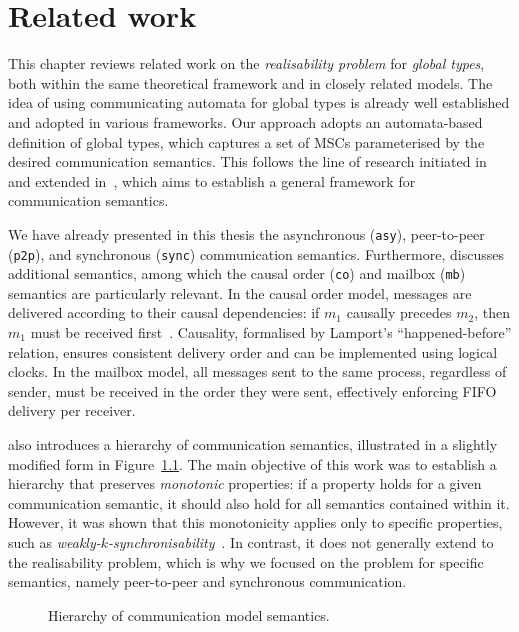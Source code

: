 \chapter{Related work}\label{sec:rel}
This chapter reviews related work on the \emph{realisability problem} 
for \emph{global types}, both within the same theoretical framework 
and in closely related models.  
The idea of using communicating automata for global types is already 
well established and adopted in various frameworks. Our approach 
adopts an automata-based definition of global types, which captures a 
set of MSCs parameterised by the desired communication semantics.  
This follows the line of research initiated in~\cite{di2023partial} 
and extended in~\cite{di2025realisability}, which aims to establish a 
general framework for communication semantics.  

We have already presented in this thesis the asynchronous 
(\verb|asy|), peer-to-peer (\verb|p2p|), and synchronous 
(\verb|sync|) communication semantics.  
Furthermore, \cite{di2023partial} discusses additional semantics, 
among which the causal order (\verb|co|) and mailbox (\verb|mb|) 
semantics are particularly relevant.
In the causal order model, messages are delivered according 
to their causal dependencies: if $m_1$ causally precedes $m_2$, then 
$m_1$ must be received first~\cite{lamport2019time}.  
Causality, formalised by Lamport’s ``happened-before'' relation, ensures 
consistent delivery order and can be implemented using logical clocks.  
In the mailbox model, all messages sent to the same process, 
regardless of sender, must be received in the order they were sent, 
effectively enforcing FIFO delivery per receiver.  

\cite{di2023partial} also introduces a hierarchy of communication 
semantics, illustrated in a slightly modified form in 
Figure~\ref{fig:coms}.  
The main objective of this work was to establish a hierarchy that 
preserves \emph{monotonic} properties: if a property holds for a given 
communication semantic, it should also hold for all semantics 
contained within it.  
However, it was shown that this monotonicity applies only to specific 
properties, such as \emph{weakly-$k$-synchronisability}~\cite{di2023partial}.  
In contrast, it does not generally extend to the realisability 
problem, which is why we focused on the problem for specific semantics, 
namely peer-to-peer and synchronous communication.

\bigskip

\begin{figure}[!ht]
\centering
{}
\caption{Hierarchy of communication model semantics.}
\label{fig:coms}
\end{figure}

